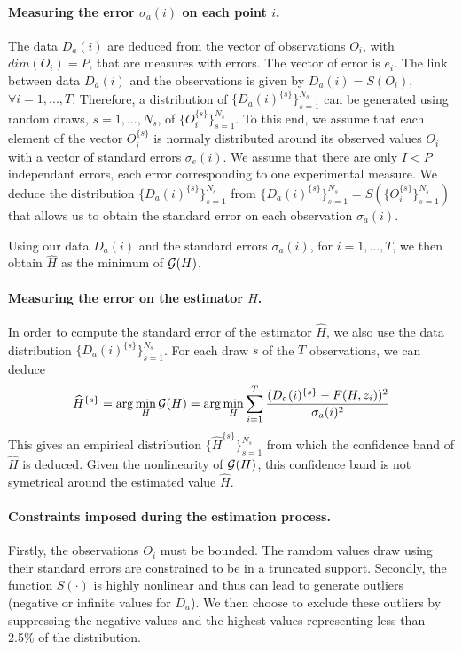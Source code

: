 \documentclass[12pt,a4paper]{article}
\begin{document}
\paragraph{Measuring the error $\sigma_a(i)$ on each point $i$.} The data $D_a(i)$ are deduced from the vector of observations $O_i$, with $dim(O_i)=P$, that are measures with errors. The vector of error is $e_i$. The link between data $D_a(i)$ and the observations is given by $D_a(i) = S(O_i)$, $\forall i=1,...,T$. Therefore, a  distribution of $\{D_a(i)^{\{s\}}\}_{s=1}^{N_s}$ can be generated using random draws, $s=1,...,N_s$, of $\{O_i^{\{s\}}\}_{s=1}^{N_s}$. To this end, we assume that each element of the vector $O_i^{\{s\}}$ is normaly distributed around its observed values $O_i$ with a vector of standard errors $\sigma_e(i)$.  We assume that there are only $I<P$ independant errors, each error corresponding to one experimental measure. We deduce  the distribution $\{D_a(i)^{\{s\}}\}_{s=1}^{N_s}$ from $\{D_a(i)^{\{s\}}\}_{s=1}^{N_s} = S(\{O_i^{\{s\}}\}_{s=1}^{N_s})$ that allows us to obtain the standard error on each observation $\sigma_a(i)$. 

Using our data $D_a(i)$ and the standard errors $\sigma_a(i)$, for $i=1,...,T$, we then obtain $\widehat{H}$ as the minimum of  ${\cal G}(H)$. 

\paragraph{Measuring the error on the estimator $H$.} In order to compute the standard error of the estimator $\widehat{H}$, we also use the data distribution $\{D_a(i)^{\{s\}}\}_{s=1}^{N_s}$. For each draw $s$ of the $T$ observations, we can deduce 
 $$
 \widehat{H}^{\{s\}} = \arg \min _H {\cal G}(H) = \arg \min _H \sum_{i=1}^T \frac{(D_a(i)^{\{s\}} - F(H,z_i))^2}{\sigma_a(i)^2}
 $$
This gives an empirical distribution $\{\widehat{H}^{\{s\}}\}_{s=1}^{N_s}$ from which the confidence band of $\widehat{H}$ is deduced. Given the nonlinearity of ${\cal G}(H)$, this confidence band is not symetrical around the estimated value $\widehat{H}$. 

\paragraph{Constraints imposed during the estimation process.} Firstly, the observations $O_i$ must be bounded. The ramdom values draw using their standard errors are constrained to be in a truncated support. Secondly, the function $S(\cdot)$ is highly nonlinear and thus can lead to generate outliers (negative or infinite values for $D_a$). We then choose to exclude these outliers by suppressing the negative values and the highest values representing less than 2.5\% of the distribution.    
\end{document}
